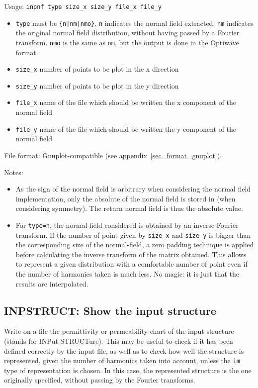     Usage: \lstinline!inpnf type size_x size_y file_x file_y!
    
    \begin{itemize}
    \item
    \lstinline!type!    must be \lstinline!{n|nm|nmo}!, \lstinline!n! indicates the 
            normal field extracted. \lstinline!nm! indicates the original normal field distribution, without having passed by a Fourier transform. \lstinline!nmo! is the same as \lstinline!nm!, but the output is done in the Optiwave format.
    \item
    \lstinline!size_x!  number of points to be plot in the x direction
    \item
    \lstinline!size_y!  number of points to be plot in the y direction
    \item
    \lstinline!file_x!    name of the file which should be written the x component of the normal field
    \item
    \lstinline!file_y!    name of the file which should be written the y component of the normal field
    \end{itemize}
    
File format: Gnuplot-compatible (see appendix~\ref{sec_format_gnuplot}).

Notes: 
\begin{itemize}
	\item
	As the sign of the normal field is arbitrary when considering the normal field implementation, only the absolute of the normal field is stored in (when considering symmetry). The return normal field is thus the absolute value.
	\item For \lstinline!type=n!, the normal-field considered is obtained by an inverse Fourier transform.
	If the number of point given by \lstinline!size_x! and \lstinline!size_y! is bigger than 
	the corresponding size of the normal-field, a zero padding technique is applied 
	before calculating the inverse transform of the matrix obtained. This allows to
	represent a given distribution with a comfortable number of point even if the
	number of harmonics taken is much less. No magic: it is just that the results
	are interpolated.
\end{itemize}
\subsection{INPSTRUCT: Show the input structure}
\label{subsec_inpstruct}
Write on a file the permittivity or permeability chart of the input structure (stands for INPut STRUCTure). This may be useful to check if it has been 
defined correctly by the input file, as well as to check how well the structure
is represented, given the number of harmonics taken into account, unless the \lstinline!im! type of representation is chosen. In this case, the represented structure is the one originally specified, without passing by the Fourier transforms.
    
